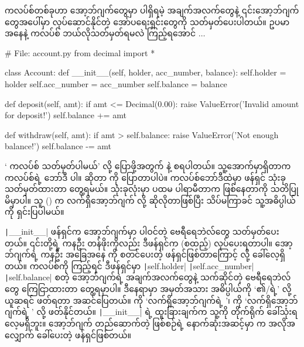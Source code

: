 ကလပ်စ်တစ်ခုဟာ အော့ဘ်ဂျက်တွေမှာ ပါရှိရမဲ့ အချက်အလက်တွေနဲ့ ၎င်းအော့ဘ်ဂျက်တွေအပေါ်မှာ လုပ်\allowbreak ဆောင်နိုင်တဲ့ အော်ပရေးရှင်းတွေကို သတ်မှတ်ပေးပါတယ်။ ဥပမာ အနေနဲ့  ကလပ်စ် ဘယ်လိုသတ်မှတ်ရမလဲ ကြည့်ရအောင် $\ldots$ 


%
\begin{py}
# File: account.py
from decimal import *


class Account:
    def __init__(self, holder, acc_number, balance):
        self.holder = holder
        self.acc_number = acc_number
        self.balance = balance

    def deposit(self, amt):
        if amt <= Decimal(0.00):
            raise ValueError('Invalid amount for deposit!')
        self.balance += amt

    def withdraw(self, amt):
        if amt > self.balance:
            raise ValueError('Not enough balance!')
        self.balance -= amt
\end{py}
%

‘ ကလပ်စ် သတ်မှတ်ပါမယ်’ လို့ ပြောဖို့အတွက်  နဲ့ စရပါတယ်။ သူ့အောက်မှာရှိတာက  ကလပ်စ်ရဲ့ ဘော်ဒီ  ပါ။  ဆိုတာ  ကို ပြောတာပါပဲ။ ကလပ်စ်ဘော်ဒီထဲမှာ ဖန်ရှင် သုံးခု သတ်မှတ်ထားတာ တွေ့ရမယ်။ သုံးခုလုံးမှာ ပထမ ပါရာမီတာက  ဖြစ်နေတာကို သတိပြုမိမှာပါ။ သူ () က လက်ရှိအော့ဘ်ဂျက်  လို့ ဆိုလိုတာဖြစ်ပြီး သိပ်မကြာခင် သူ့အဓိပ္ပါယ်ကို ရှင်းပြပါမယ်။

 

\texttt|__init__| ဖန်ရှင်က အော့ဘ်ဂျက်မှာ ပါဝင်တဲ့ ဗေရီရေဘဲလ်တွေ သတ်မှတ်ပေးတယ်။ ၎င်းတို့ရဲ့ ကနဦး တန်ဖိုးကိုလည်း ဒီဖန်ရှင်က   (စထည့်) လုပ်ပေးရတာပါ။ အော့ဘ်ဂျက်ရဲ့ ကနဦး အခြေအနေ  ကို စတင်ပေးတဲ့ ဖန်ရှင်ဖြစ်တာကြောင့်  လို့ ခေါ်လေ့ရှိတယ်။  ကလပ်စ်ကို ကြည့်ရင် ဒီဖန်ရှင်မှာ \texttt|self.holder|\fEn{,} \texttt|self.acc_number|\fEn{,} \texttt|self.balance| စတဲ့ အော့ဘ်ဂျက်ရဲ့ အချက်အလက်တွေနဲ့ သက်ဆိုင်တဲ့ ဗေရီရေဘဲလ်တွေ ကြေငြာထားတာ တွေ့ရမှာပါ။ ဒီနေရာမှာ  အမှတ်အသား အဓိပ္ပါယ်ကို ‘၏/ရဲ့’ လို့ ယူဆရင် ဖတ်ရတာ အဆင်ပြေတယ်။  ကို ‘လက်ရှိအော့ဘ်ဂျက်ရဲ့ ’၊  ကို ‘လက်ရှိအော့ဘ်ဂျက်ရဲ့ ’ လို့ ဖတ်နိုင်တယ်။ \texttt|__init__| ရဲ့ ထူးခြားချက်က သူ့ကို တိုက်ရိုက် ခေါ်သုံးရလေ့မရှိဘူး။ အော့ဘ်ဂျက် တည်ဆောက်တဲ့ ဖြစ်စဉ်ရဲ့ နောက်ဆုံးအဆင့်မှာ  က အလိုအလျှောက် ခေါ်ပေးတဲ့ ဖန်ရှင်ဖြစ်တယ်။


